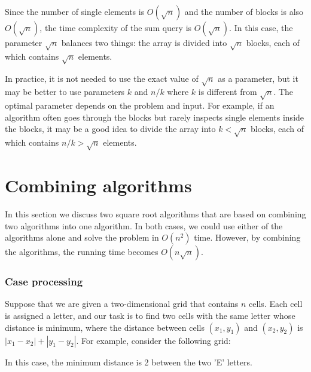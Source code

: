 Since the number of single elements is $O(\sqrt n)$
and the number of blocks is also $O(\sqrt n)$,
the time complexity of the sum query is $O(\sqrt n)$.
In this case, the parameter $\sqrt n$ balances two things:
the array is divided into $\sqrt n$ blocks,
each of which contains $\sqrt n$ elements.

In practice, it is not needed to use the
exact value of $\sqrt n$ as a parameter, but it may be better to
use parameters $k$ and $n/k$ where $k$ is
different from $\sqrt n$.
The optimal parameter depends on the problem and input.
For example, if an algorithm often goes
through the blocks but rarely inspects
single elements inside the blocks,
it may be a good idea to divide the array into
$k < \sqrt n$ blocks, each of which contains $n/k > \sqrt n$
elements.

\section{Combining algorithms}

In this section we discuss two square root algorithms
that are based on combining two algorithms into one algorithm.
In both cases, we could use either of the algorithms
alone and solve the problem in $O(n^2)$ time.
However, by combining the algorithms, the running
time becomes $O(n \sqrt n)$.

\subsubsection{Case processing}

Suppose that we are given a two-dimensional
grid that contains $n$ cells.
Each cell is assigned a letter,
and our task is to find two cells
with the same letter whose distance is minimum,
where the distance between cells
$(x_1,y_1)$ and $(x_2,y_2)$ is $|x_1-x_2|+|y_1-y_2|$.
For example, consider the following grid:

\begin{center}
\end{center}
In this case, the minimum distance is 2 between the two 'E' letters.

